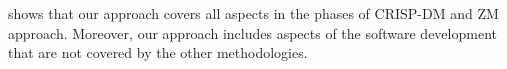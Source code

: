  shows that our approach covers all aspects in the phases of CRISP-DM and
ZM approach.  Moreover, our approach includes aspects of the software development that
are not covered by the other methodologies.

